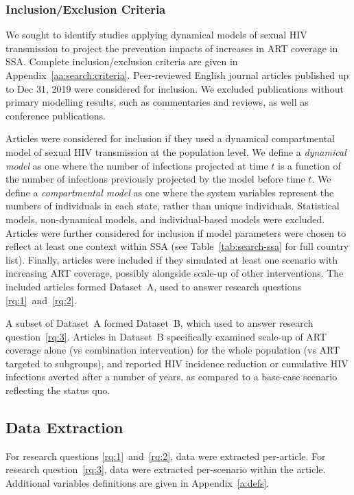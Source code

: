 \subsubsection{Inclusion/Exclusion Criteria}
\label{sss:meth:criteria}
We sought to identify studies applying dynamical models of sexual HIV transmission
to project the prevention impacts of increases in ART coverage in SSA.
Complete inclusion/exclusion criteria are given in
Appendix~\ref{aa:search:criteria}.
Peer-reviewed English journal articles published up to Dec 31, 2019
were considered for inclusion.
We excluded publications without primary modelling results,
such as commentaries and reviews, as well as conference publications.
\par
Articles were considered for inclusion if they used a dynamical compartmental model of
sexual HIV transmission at the population level.
We define a \emph{dynamical model} as one where
the number of infections projected at time $t$ is a function of
the number of infections previously projected by the model before time $t$.
We define a \emph{compartmental model} as one where
the system variables represent the numbers of individuals in each state,
rather than unique individuals.
Statistical models, non-dynamical models, and individual-based models were excluded.
Articles were further considered for inclusion if model parameters
were chosen to reflect at least one context within SSA
(see Table~\ref{tab:search-ssa} for full country list).
Finally, articles were included if they
simulated at least one scenario with increasing ART coverage,
possibly alongside scale-up of other interventions.
The included articles formed Dataset~A,
used to answer research questions \ref{rq:1}~and~\ref{rq:2}.
\par
A subset of Dataset~A formed Dataset~B,
which used to answer research question~\ref{rq:3}.
Articles in Dataset~B specifically examined
scale-up of ART coverage alone (vs combination intervention)
for the whole population (vs ART targeted to subgroups),
and reported HIV incidence reduction or cumulative HIV infections averted
after a number of years, as compared to a base-case scenario reflecting the status quo.
\subsection{Data Extraction}
\label{ss:meth:data}
For research questions \ref{rq:1}~and~\ref{rq:2}, data were extracted per-article.
For research question~\ref{rq:3}, data were extracted per-scenario within the article.
Additional variables definitions are given in Appendix~\ref{a:defs}.
